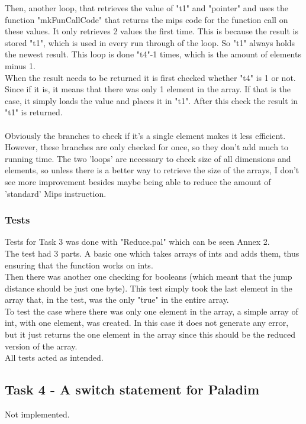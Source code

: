 \documentclass[12pt]{article}
\begin{document}
\endgroup
Then, another loop, that retrieves the value of "t1" and "pointer" and uses the function "mkFunCallCode" that returns the mips code for the function call on these values. It only retrieves 2 values the first time. This is because the result is stored "t1", which is used in every run through of the loop. So "t1" always holds the newest result. This loop is done "t4"-1 times, which is the amount of elements minus 1.\\
When the result needs to be returned it is first checked whether "t4" is 1 or not. Since if it is, it means that there was only 1 element in the array. If that is the case, it simply loads the value and places it in "t1". After this check the result in "t1" is returned.\\
\\
Obviously the branches to check if it's a single element makes it less efficient. However, these branches are only checked for once, so they don't add much to running time. The two 'loops' are necessary to check size of all dimensions and elements, so unless there is a better way to retrieve the size of the arrays, I don't see more improvement besides maybe being able to reduce the amount of 'standard' Mips instruction.

\subsubsection{Tests}
Tests for Task 3 was done with "Reduce.pal" which can be seen Annex 2.\\
The test had 3 parts. A basic one which takes arrays of ints and adds them, thus ensuring that the function works on ints.\\
Then there was another one checking for booleans (which meant that the jump distance should be just one byte). This test simply took the last element in the array that, in the test, was the only "true" in the entire array.\\
To test the case where there was only one element in the array, a simple array of int, with one element, was created. In this case it does not generate any error, but it just returns the one element in the array since this should be the reduced version of the array.\\
All tests acted as intended.


\newpage
\subsection{Task 4 - A switch statement for Paladim}
Not implemented.
\end{document}
